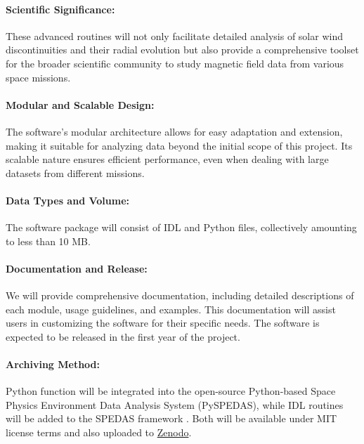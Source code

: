 \documentclass[
  letterpaper,
  DIV=11,
  numbers=noendperiod]{scrartcl}
\let\oldparagraph\paragraph
\renewcommand{\paragraph}[1]{\oldparagraph{#1}\mbox{}}
\begin{document}
\paragraph{Scientific Significance:}\label{scientific-significance-1}

These advanced routines will not only facilitate detailed analysis of
solar wind discontinuities and their radial evolution but also provide a
comprehensive toolset for the broader scientific community to study
magnetic field data from various space missions.

\paragraph{Modular and Scalable
Design:}\label{modular-and-scalable-design}

The software's modular architecture allows for easy adaptation and
extension, making it suitable for analyzing data beyond the initial
scope of this project. Its scalable nature ensures efficient
performance, even when dealing with large datasets from different
missions.

\paragraph{Data Types and Volume:}\label{data-types-and-volume-1}

The software package will consist of IDL and Python files, collectively
amounting to less than 10 MB.

\paragraph{Documentation and Release:}\label{documentation-and-release}

We will provide comprehensive documentation, including detailed
descriptions of each module, usage guidelines, and examples. This
documentation will assist users in customizing the software for their
specific needs. The software is expected to be released in the first
year of the project.

\paragraph{Archiving Method:}\label{archiving-method-1}

Python function will be integrated into the open-source Python-based
Space Physics Environment Data Analysis System (PySPEDAS), while IDL
routines will be added to the SPEDAS framework \cite{Angelopoulos19}.
Both will be available under MIT license terms and also uploaded to
\href{https://zenodo.org/}{Zenodo}.
\end{document}
